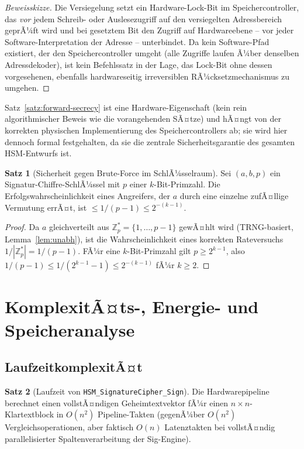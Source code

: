 ﻿\documentclass[a4paper,12pt]{article}
\theoremstyle{definition}
\newtheorem{satz}{Satz}
\begin{document}
\begin{proof}[Beweisskizze]
	Die Versiegelung setzt ein Hardware-Lock-Bit im Speichercontroller, das \emph{vor} jedem Schreib- oder Auslesezugriff auf den versiegelten Adressbereich geprÃ¼ft wird und bei gesetztem Bit den Zugriff auf Hardwareebene -- vor jeder Software-Interpretation der Adresse -- unterbindet. Da kein Software-Pfad existiert, der den Speichercontroller umgeht (alle Zugriffe laufen Ã¼ber denselben Adressdekoder), ist kein Befehlssatz in der Lage, das Lock-Bit ohne dessen vorgesehenen, ebenfalls hardwareseitig irreversiblen RÃ¼cksetzmechanismus zu umgehen. \qedhere
\end{proof}

Satz~\ref{satz:forward-secrecy} ist eine Hardware-Eigenschaft (kein rein algorithmischer Beweis wie die vorangehenden SÃ¤tze) und hÃ¤ngt von der korrekten physischen Implementierung des Speichercontrollers ab; sie wird hier dennoch formal festgehalten, da sie die zentrale Sicherheitsgarantie des gesamten HSM-Entwurfs ist.

\begin{satz}[Sicherheit gegen Brute-Force im SchlÃ¼sselraum]
	Sei $(a,b,p)$ ein Signatur-Chiffre-SchlÃ¼ssel mit $p$ einer $k$-Bit-Primzahl. Die Erfolgswahrscheinlichkeit eines Angreifers, der $a$ durch eine einzelne zufÃ¤llige Vermutung errÃ¤t, ist $\le 1/(p-1) \le 2^{-(k-1)}$.
\end{satz}

\begin{proof}
	Da $a$ gleichverteilt aus $\mathbb{Z}_p^* = \{1,\ldots,p-1\}$ gewÃ¤hlt wird (TRNG-basiert, Lemma~\ref{lem:unabh}), ist die Wahrscheinlichkeit eines korrekten Rateversuchs $1/|\mathbb{Z}_p^*| = 1/(p-1)$. FÃ¼r eine $k$-Bit-Primzahl gilt $p \ge 2^{k-1}$, also $1/(p-1) \le 1/(2^{k-1}-1) \le 2^{-(k-1)}$ fÃ¼r $k \ge 2$. \qedhere
\end{proof}

\section{KomplexitÃ¤ts-, Energie- und Speicheranalyse}
\label{sec:analyse}

\subsection{LaufzeitkomplexitÃ¤t}

\begin{satz}[Laufzeit von \texttt{HSM\_SignatureCipher\_Sign}]
	Die Hardwarepipeline berechnet einen vollstÃ¤ndigen Geheimtextvektor fÃ¼r einen $n \times n$-Klartextblock in $O(n^2)$ Pipeline-Takten (gegenÃ¼ber $O(n^2)$ Vergleichsoperationen, aber faktisch $O(n)$ Latenztakten bei vollstÃ¤ndig parallelisierter Spaltenverarbeitung der Sig-Engine).
\end{satz}
\end{document}
